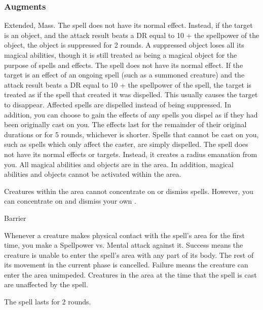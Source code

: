 \subsubsection{Augments}
 Extended, Mass.
The spell does not have its normal effect.
Instead, if the target is an object, and the attack result beats a DR equal to 10 + the spellpower of the object, the object is suppressed for 2 rounds.
A suppressed object loses all its magical abilities, though it is still treated as being a magical object for the purpose of spells and effects.
The spell does not have its normal effect.
If the target is an effect of an ongoing spell (such as a summoned creature) and the attack result beats a DR equal to 10 + the spellpower of the spell, the target is treated as if the spell that created it was dispelled.
This usually causes the target to disappear.
Affected spells are dispelled instead of being suppressed.
In addition, you can choose to gain the effects of any spells you dispel as if they had been originally cast on you.
The effects last for the remainder of their original durations or for 5 rounds, whichever is shorter.
Spells that cannot be cast on you, such as spells which only affect the caster, are simply dispelled.
The spell does not have its normal effects or targets.
Instead, it creates a \areasmall radius emanation from you.
All magical abilities and objects are  in the area.
In addition, magical abilities and objects cannot be activated within the area.
\par Creatures within the area cannot concentrate on or dismiss spells. However, you can concentrate on and dismiss your own .
\begin{spellsection}{Barrier}
\begin{spellcontent}
\begin{spelltargetinginfo}
\end{spelltargetinginfo}
\begin{spelleffects}
\spelleffect
Whenever a creature makes physical contact with the spell's area for the first time, you make a Spellpower vs. Mental attack against it.
Success means the creature is unable to enter the spell's area with any part of its body.
The rest of its movement in the current phase is cancelled.
Failure means the creature can enter the area unimpeded.
Creatures in the area at the time that the spell is cast are unaffected by the spell.
\spelldur \durshort
\end{spelleffects}
\end{spellcontent}
\begin{spellfooter}
\miscastexplode
\end{spellfooter}
\begin{spellcantrip}
The spell lasts for 2 rounds.
\end{spellcantrip}
\end{spellsection}
